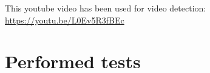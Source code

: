 \documentclass[12pt, a4paper]{article}
\begin{document}
This youtube video has been used for video detection: \href{https://youtu.be/L0Ev5R3fBEc}{https://youtu.be/L0Ev5R3fBEc}











\section{Performed tests}
\end{document}
